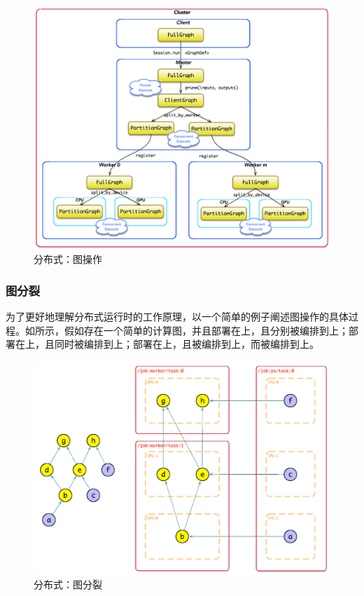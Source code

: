 \begin{content}
\begin{figure}[H]
\centering
\includegraphics[width=1.0\textwidth]{figures/dist-runtime.png}
\caption{分布式：图操作}
 \label{fig:dist-runtime}
\end{figure}

\subsubsection{图分裂}

为了更好地理解分布式运行时的工作原理，以一个简单的例子阐述图操作的具体过程。如所示，假如存在一个简单的计算图，并且部署在上，且分别被编排到上；部署在上，且同时被编排到上；部署在上，且被编排到上，而被编排到上。

\begin{figure}[H]
\centering
\includegraphics[width=1.0\textwidth]{figures/dist-exp-1.png}
\caption{分布式：图分裂}
 \label{fig:dist-exp-1}
\end{figure}


\end{content}
